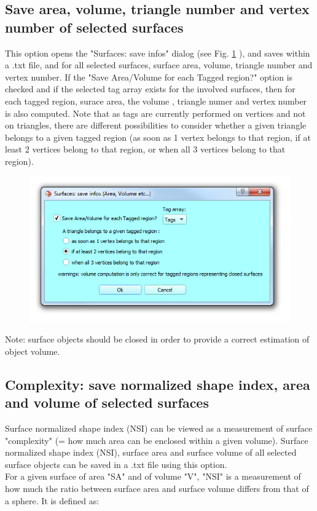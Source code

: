 \subsection{Save area, volume, triangle number and vertex number of selected surfaces}
\noindent
This option opens the "Surfaces: save infos" dialog (see Fig. \ref{surface_infos} \pageref{surface_infos}), and saves within a .txt file, and for all selected surfaces, surface area, volume, triangle number and vertex number. If the "Save Area/Volume for each Tagged region?" option is checked and if the selected tag array exists for the involved surfaces, then for each tagged region, surace area, the volume , triangle numer and vertex number is also computed. Note that as tags are currently performed on vertices and not on triangles, there are different possibilities to consider whether a given triangle belongs to a given tagged region (as soon as 1 vertex belongs to that region, if at least 2 vertices belong to that region, or when all 3 vertices belong to that region). 

\begin{figure}
  \centering  
 \includegraphics[scale=0.5]{images/07/measurements/area_volume.png}
\label{surface_infos}
\end{figure}

 
\noindent Note: surface objects should be closed in order to provide a correct estimation of object volume.

\subsection{Complexity: save normalized shape index, area and volume of selected surfaces} \label{global_complexity_1}
\noindent
Surface normalized shape index (NSI) can be viewed as a measurement of surface "complexity" (= how much area can be enclosed within a given volume). Surface normalized shape index (NSI), surface area and surface volume of all selected surface objects can be saved in a .txt file using this option.\\
For a given surface of area "SA" and of volume "V", "NSI" is a measurement of how much the ratio between surface area and surface volume differs from that of a sphere. It is defined as: 

